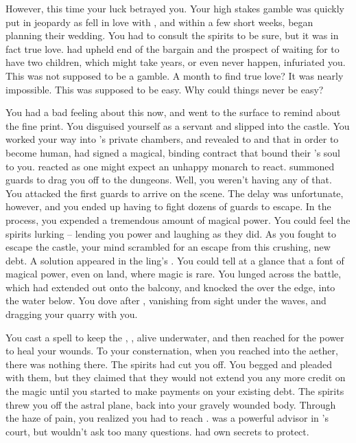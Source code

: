 \documentclass[char]{NeptuneBall}
\begin{document}
However, this time your luck betrayed you. Your high stakes gamble was quickly put in jeopardy as \cEric{} fell in love with \cAriel{}, and within a few short weeks, began planning their wedding. You had to consult the spirits to be sure, but it was in fact true love. \cAriel{} had upheld \cAriel{\their} end of the bargain and the prospect of waiting for \cAriel{\them} to have two children, which might take years, or even never happen, infuriated you. This was not supposed to be a gamble. A month to find true love? It was nearly impossible. This was supposed to be easy. Why could things never be easy?

You had a bad feeling about this now, and went to the surface to remind \cAriel{} about the fine print. You disguised yourself as a servant and slipped into the castle. You worked your way into \cEric{}'s private chambers, and revealed to \cAriel{} and \cEric{} that in order to become human, \cAriel{} had signed a magical, binding contract that bound their 's soul to you. \cEric{} reacted as one might expect an unhappy monarch to react. \cEric{\They} summoned \cEric{\their} guards to drag you off to the dungeons. Well, you weren't having any of that. You attacked the first guards to arrive on the scene. The delay was unfortunate, however, and you ended up having to fight dozens of guards to escape. In the process, you expended a tremendous amount of magical power. You could feel the spirits lurking -- lending you power and laughing as they did. As you fought to escape the castle, your mind scrambled for an escape from this crushing, new debt. A solution appeared in the \cEric{\prince}ling's \cSlave{\sibling}. You could tell at a glance that \cSlave{\they} \cSlave{\were} a font of magical power, even on land, where magic is rare. You lunged across the battle, which had extended out onto the balcony, and knocked the \cSlave{\kid} over the edge, into the water below. You dove after \cSlave{\them}, vanishing from sight under the waves, and dragging your quarry with you.

You cast a spell to keep the \cSlave{\kid}, \cSlave{}, alive underwater, and then reached for the power to heal your wounds. To your consternation, when you reached into the aether, there was nothing there. The spirits had cut you off. You begged and pleaded with them, but they claimed that they would not extend you any more credit on the magic until you started to make payments on your existing debt. The spirits threw you off the astral plane, back into your gravely wounded body. Through the haze of pain, you realized you had to reach \cManta{}. \cManta{} was a powerful advisor in \cKing{}'s court, but \cManta{\they} wouldn't ask too many questions. \cManta{\They} had \cManta{\their} own secrets to protect.
\end{document}
